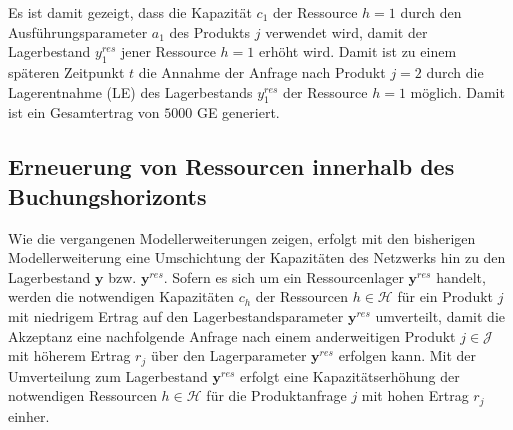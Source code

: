 Es ist damit gezeigt, dass die Kapazität $c_{1}$ der Ressource $h=1$ durch den Ausführungsparameter $a_{1}$ des Produkts $j$ verwendet wird, damit der Lagerbestand $y_{1}^{res}$ jener Ressource $h=1$ erhöht wird. Damit ist zu einem späteren Zeitpunkt $t$ die Annahme der Anfrage nach Produkt $j=2$ durch die Lagerentnahme (LE) des Lagerbestands $y_{1}^{res}$ der Ressource $h=1$ möglich. Damit ist ein Gesamtertrag von $5000$ GE generiert. 

\subsection{Erneuerung von Ressourcen innerhalb des Buchungshorizonts}

Wie die vergangenen Modellerweiterungen zeigen, erfolgt mit den bisherigen Modellerweiterung eine Umschichtung der Kapazitäten des Netzwerks hin zu den Lagerbestand $\textbf{y}$ bzw. $\textbf{y}^{res}$. Sofern es sich um ein Ressourcenlager $\textbf{y}^{res}$ handelt, werden die notwendigen Kapazitäten $c_{h}$ der Ressourcen $h\in\mathcal{H}$ für ein Produkt $j$ mit niedrigem Ertrag auf den Lagerbestandsparameter $\textbf{y}^{res}$ umverteilt, damit die Akzeptanz eine nachfolgende Anfrage nach einem anderweitigen Produkt $j\in\mathcal{J}$ mit höherem Ertrag $r_{j}$ über den Lagerparameter $\textbf{y}^{res}$ erfolgen kann. %
Mit der Umverteilung zum Lagerbestand $\textbf{y}^{res}$ erfolgt eine Kapazitätserhöhung der notwendigen Ressourcen $h\in\mathcal{H}$ für die Produktanfrage $j$ mit hohen Ertrag $r_j$ einher.

